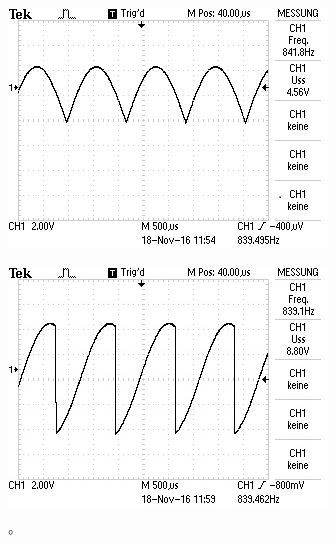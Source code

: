 \begin{figure}[!h]
\begin{minipage}[t]{0.3\textwidth}
    \label{fig:45}
    \caption{\si{\degree}}
  \end{minipage}
  \begin{minipage}[t]{0.3\textwidth}
    \includegraphics[width=\textwidth]{Bilder/105.jpeg}
    \label{fig:105}
    \caption{\si{\degree}}
  \end{minipage}
  \begin{minipage}[t]{0.3\textwidth}
    \includegraphics[width=\textwidth]{Bilder/165.jpeg}
    \label{fig:165}

\end{minipage}
\end{figure}
